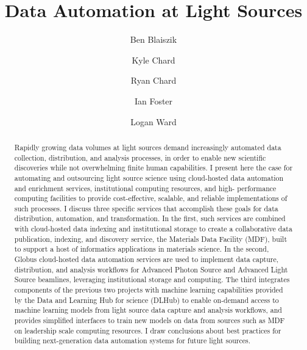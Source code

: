 \documentclass{aip-cp}
\newcommand\ryan[1]{}
\newcommand\ryan[1]{{\color{green}[Ryan: #1]}}
\begin{document}
\title{Data Automation at Light Sources}

\author[aff1]{Ben Blaiszik}
\author[aff1]{Kyle Chard}
\author[aff1]{Ryan Chard}
\author[aff1,aff2]{Ian Foster}
\author[aff1]{Logan Ward}


\maketitle


\begin{abstract}
Rapidly growing data volumes at light sources demand increasingly automated data collection, 
distribution, and analysis processes, in order to enable new scientific discoveries while not 
overwhelming finite human capabilities. I present here the case for automating and outsourcing 
light source science using cloud-hosted data automation and enrichment services, institutional 
computing resources, and high- performance computing facilities to provide cost-effective, scalable, 
and reliable implementations of such processes. I discuss three specific services that accomplish 
these goals for data distribution, automation, and transformation. In the first, such services are 
combined with cloud-hosted data indexing and institutional storage to create a 
collaborative data publication, indexing, and discovery service, the Materials Data Facility (MDF), 
built to support a host of informatics applications in materials science. In the second,  
Globus cloud-hosted data automation services are used to implement data capture, distribution, and 
analysis workflows for Advanced Photon Source and Advanced Light Source beamlines, leveraging 
institutional storage and computing. The third integrates 
components of the previous two projects with machine learning capabilities provided by the Data and 
Learning Hub for science (DLHub) to enable on-demand access to machine learning models from light 
source data capture and analysis workflows, and provides simplified interfaces to train new models 
on data from sources such as MDF on leadership scale computing resources. I draw conclusions about 
best practices for building next-generation data automation systems for future light sources.
\ryan{Map this to the new structure.}
\end{abstract}
\end{document}
